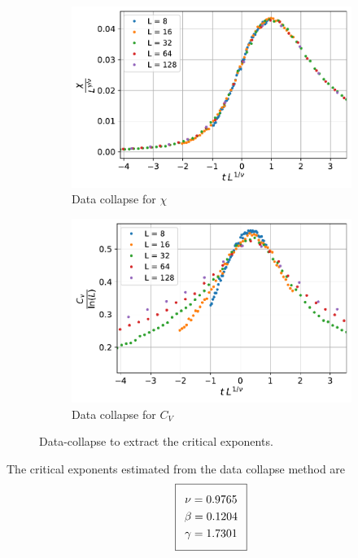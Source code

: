 \documentclass[../journal_main.tex]{subfiles}
\begin{document}
\begin{figure}[!htb]
    \vspace{1em}
    \begin{subfigure}[b]{0.47\textwidth}
        \centering
        \includegraphics[width=\textwidth]{images/data collapse/chi data collapse.pdf}
        \caption{Data collapse for $\chi$}
        \label{chi collapse}
    \end{subfigure}
    \hspace{1em}  %
    \begin{subfigure}[b]{0.47\textwidth}
        \centering
        \includegraphics[width=\textwidth]{images/data collapse/C_v data collapse.pdf}
        \caption{Data collapse for $C_V$}
        \label{C_V collapse}
    \end{subfigure}
    \caption{Data-collapse to extract the critical exponents.}
    \label{datacollapse}
\end{figure}
The critical exponents estimated from the data collapse method are
\begin{equation*}
  \addtolength{\fboxsep}{5pt}
   \boxed{
    \begin{gathered}
        \nu = 0.9765 \\
        \beta = 0.1204 \\
        \gamma = 1.7301
    \end{gathered}
}
\end{equation*}
\end{document}
